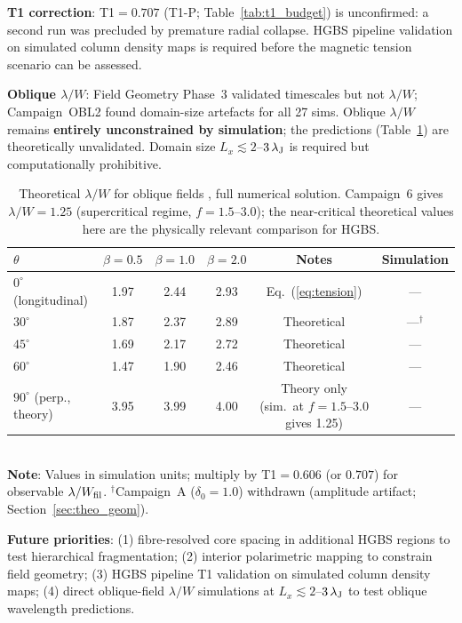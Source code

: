 \documentclass[twoside,twocolumn]{mnras}
\begin{document}
\textbf{T1 correction}: T1$=0.707$ (T1-P; Table~\ref{tab:t1_budget}) is unconfirmed:
a second run was precluded by premature radial collapse. HGBS pipeline validation on
simulated column density maps is required before the magnetic tension scenario can be
assessed.

\textbf{Oblique $\lambda/W$}: Field Geometry Phase~3 validated timescales but not
$\lambda/W$; Campaign~OBL2 found domain-size artefacts for all 27 sims. Oblique
$\lambda/W$ remains \textbf{entirely unconstrained by simulation}; the \citet{Nakamura1993}
predictions (Table~\ref{tab:oblique_theory}) are theoretically unvalidated. Domain size
$L_x \lesssim 2$--$3\,\lambda_{\rm J}$ is required but computationally prohibitive.

\begin{table}
\caption{Theoretical $\lambda/W$ for oblique fields \citep{Nakamura1993}, full numerical
solution. Campaign~6 gives $\lambda/W=1.25$ (supercritical regime, $f=1.5$--$3.0$); the
near-critical theoretical values here are the physically relevant comparison for HGBS.}
\label{tab:oblique_theory}
\small
\begin{tabular}{lccccc}
\toprule
$\theta$ & $\beta=0.5$ & $\beta=1.0$ & $\beta=2.0$ & Notes & Simulation \\
\midrule
$0^\circ$ (longitudinal) & 1.97 & 2.44 & 2.93 & Eq.~(\ref{eq:tension}) & --- \\
$30^\circ$ & 1.87 & 2.37 & 2.89 & Theoretical & ---$^\dagger$ \\
$45^\circ$ & 1.69 & 2.17 & 2.72 & Theoretical & --- \\
$60^\circ$ & 1.47 & 1.90 & 2.46 & Theoretical & --- \\
$90^\circ$ (perp., theory) & 3.95 & 3.99 & 4.00 & Theory only (sim.\ at $f=1.5$--$3.0$ gives 1.25) & --- \\
\bottomrule
\end{tabular}
\\ \footnotesize \textbf{Note}: Values in simulation units; multiply by T1$=0.606$ (or $0.707$) for observable $\lambda/W_{\rm fil}$. $^\dagger$Campaign~A ($\delta_0=1.0$) withdrawn (amplitude artifact; Section~\ref{sec:theo_geom}).
\end{table}

\textbf{Future priorities}: (1) fibre-resolved core spacing in additional HGBS regions
to test hierarchical fragmentation; (2) interior polarimetric mapping to constrain
field geometry; (3) HGBS pipeline T1 validation on simulated column density maps;
(4) direct oblique-field $\lambda/W$ simulations at $L_x \lesssim 2$--$3\,\lambda_{\rm J}$
to test \citet{Nakamura1993} oblique wavelength predictions.
\end{document}
